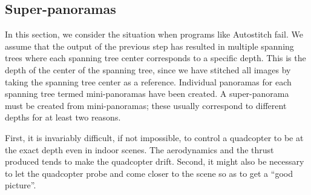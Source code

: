 \documentclass[10pt,twocolumn,letterpaper]{article}
\begin{document}
\subsection{Super-panoramas}
In this section, we consider the situation when programs like
Autostitch fail.  We assume that the output of the previous step has
resulted in multiple spanning trees where each spanning tree center
corresponds to a specific depth. This is the depth of the center of
the spanning tree, since we have stitched all images by taking the
spanning tree center as a reference.  Individual panoramas for each
spanning tree termed mini-panoramas have been created. A
super-panorama must be created from mini-panoramas; these usually
correspond to different depths for at least two reasons.

First, it is invariably difficult, if not impossible, to control a
quadcopter to be at the exact depth even in indoor scenes.  The
aerodynamics and the thrust produced tends to make the quadcopter
drift.  Second, it might also be necessary to let the quadcopter probe
and come closer to the scene so as to get a ``good picture''.
\end{document}
